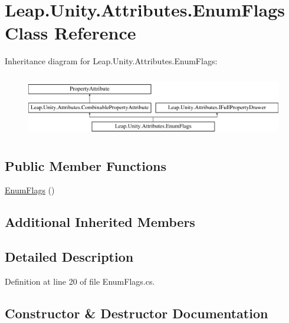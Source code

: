\hypertarget{class_leap_1_1_unity_1_1_attributes_1_1_enum_flags}{}\section{Leap.\+Unity.\+Attributes.\+Enum\+Flags Class Reference}
\label{class_leap_1_1_unity_1_1_attributes_1_1_enum_flags}
Inheritance diagram for Leap.\+Unity.\+Attributes.\+Enum\+Flags\+:\begin{figure}[H]
\begin{center}
\leavevmode
\includegraphics[height=2.772277cm]{class_leap_1_1_unity_1_1_attributes_1_1_enum_flags}
\end{center}
\end{figure}
\subsection*{Public Member Functions}
\begin{DoxyCompactItemize}
\item 
\mbox{\hyperlink{class_leap_1_1_unity_1_1_attributes_1_1_enum_flags_a08f34b36aefb4af0104a1cf63bebc017}{Enum\+Flags}} ()
\end{DoxyCompactItemize}
\subsection*{Additional Inherited Members}


\subsection{Detailed Description}


Definition at line 20 of file Enum\+Flags.\+cs.



\subsection{Constructor \& Destructor Documentation}
\mbox{\label{class_leap_1_1_unity_1_1_attributes_1_1_enum_flags_a08f34b36aefb4af0104a1cf63bebc017}} 
